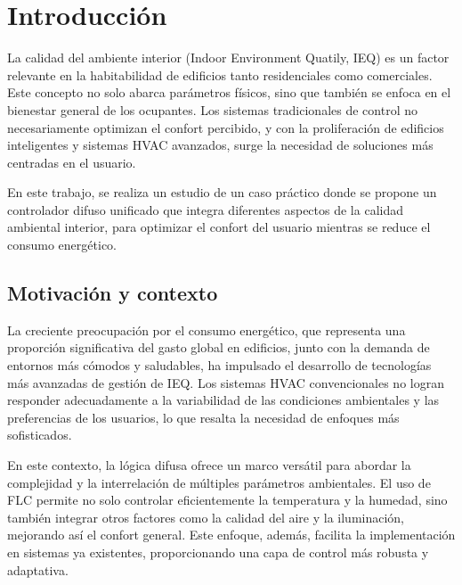 \section{Introducción}

La calidad del ambiente interior (Indoor Environment Quatily, IEQ) es un factor relevante en la habitabilidad de edificios tanto residenciales como comerciales. Este concepto no solo abarca parámetros físicos, sino que también se enfoca en el bienestar general de los ocupantes. Los sistemas tradicionales de control no necesariamente optimizan el confort percibido, y con la proliferación de edificios inteligentes y sistemas HVAC avanzados, surge la necesidad de soluciones más centradas en el usuario.

En este trabajo, se realiza un estudio de un caso práctico donde se propone un controlador difuso unificado que integra diferentes aspectos de la calidad ambiental interior, para optimizar el confort del usuario mientras se reduce el consumo energético.

\subsection{Motivación y contexto}

La creciente preocupación por el consumo energético, que representa una proporción significativa del gasto global en edificios, junto con la demanda de entornos más cómodos y saludables, ha impulsado el desarrollo de tecnologías más avanzadas de gestión de IEQ. Los sistemas HVAC convencionales no logran responder adecuadamente a la variabilidad de las condiciones ambientales y las preferencias de los usuarios, lo que resalta la necesidad de enfoques más sofisticados.

En este contexto, la lógica difusa ofrece un marco versátil para abordar la complejidad y la interrelación de múltiples parámetros ambientales. El uso de FLC permite no solo controlar eficientemente la temperatura y la humedad, sino también integrar otros factores como la calidad del aire y la iluminación, mejorando así el confort general. Este enfoque, además, facilita la implementación en sistemas ya existentes, proporcionando una capa de control más robusta y adaptativa.

\begin{comment}
	contenidos...
	\begin{figure}[H]
		\centering
		\texttt{[image: imgs/INE-grafica1.jpeg]}
		\caption{Población por grupos de edad que han usado Internet en los últimos tres meses (INE, 2018-23)}
		\label{fig:grafica1-INE}
	\end{figure}
	
	
	\autoref{fig:...}
\end{comment}


